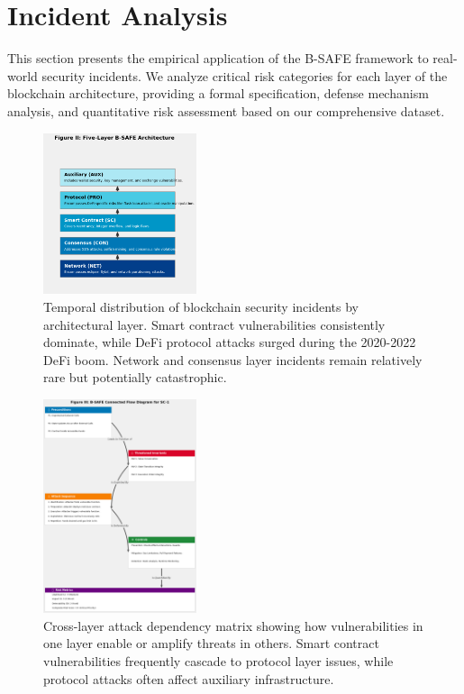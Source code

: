\section{Incident Analysis}
\label{sec:incident_analysis}

This section presents the empirical application of the B-SAFE framework to real-world security incidents. We analyze critical risk categories for each layer of the blockchain architecture, providing a formal specification, defense mechanism analysis, and quantitative risk assessment based on our comprehensive dataset.

\begin{figure}[H]
\centering
\includegraphics[width=0.4\textwidth]{../figure/fig2.png}
\caption{Temporal distribution of blockchain security incidents by architectural layer. Smart contract vulnerabilities consistently dominate, while DeFi protocol attacks surged during the 2020-2022 DeFi boom. Network and consensus layer incidents remain relatively rare but potentially catastrophic.}
\label{fig:incident_timeline}
\end{figure}

\begin{figure}[H]
\centering
\includegraphics[width=0.4\textwidth]{../figure/fig3.png}
\caption{Cross-layer attack dependency matrix showing how vulnerabilities in one layer enable or amplify threats in others. Smart contract vulnerabilities frequently cascade to protocol layer issues, while protocol attacks often affect auxiliary infrastructure.}
\label{fig:cross_layer_dependencies}
\end{figure}

